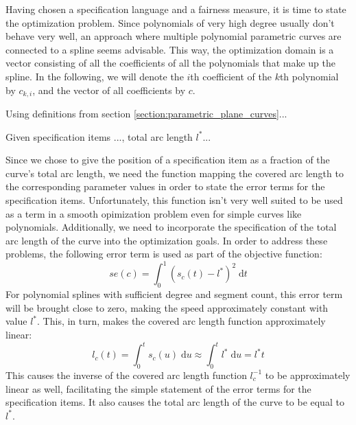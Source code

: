 \documentclass[a4paper]{article}
\newcommand{\apply}[2]{#1\!\left(#2\right)}
\begin{document}
				Having chosen a specification language and a fairness measure, it is time to state the optimization problem. Since polynomials of very high degree usually don't behave very well, an approach where multiple polynomial parametric curves are connected to a spline seems advisable. This way, the optimization domain is a vector consisting of all the coefficients of all the polynomials that make up the spline. In the following, we will denote the \(i\)th coefficient of the \(k\)th polynomial by \(c_{k,i}\), and the vector of all coefficients by \(c\).


				Using definitions from section \ref{section:parametric_plane_curves}...

				Given specification items ..., total arc length \(l^*\)...

				Since we chose to give the position of a specification item as a fraction of the curve's total arc length, we need the function mapping the covered arc length to the corresponding parameter values in order to state the error terms for the specification items. Unfortunately, this function isn't very well suited to be used as a term in a smooth opimization problem even for simple curves like polynomials. Additionally, we need to incorporate the specification of the total arc length of the curve into the optimization goals. In order to address these problems, the following error term is used as part of the objective function:
				\begin{displaymath}
					\apply{se}{c} = \int_{0}^{1}\left(\apply{s_c}{t} - l^*\right)^2\;\mathrm{d}t
				\end{displaymath}
				For polynomial splines with sufficient degree and segment count, this error term will be brought close to zero, making the speed approximately constant with value \(l^*\). This, in turn, makes the covered arc length function approximately linear:
				\begin{displaymath}
					\apply{l_c}{t} = \int_{0}^{t}\apply{s_c}{u}\;\mathrm{d}u \approx \int_{0}^{t}l^*\;\mathrm{d}u = l^*t
				\end{displaymath}
				This causes the inverse of the covered arc length function \(l_c^{-1}\) to be approximately linear as well, facilitating the simple statement of the error terms for the specification items. It also causes the total arc length of the curve to be equal to \(l^*\).
\end{document}
